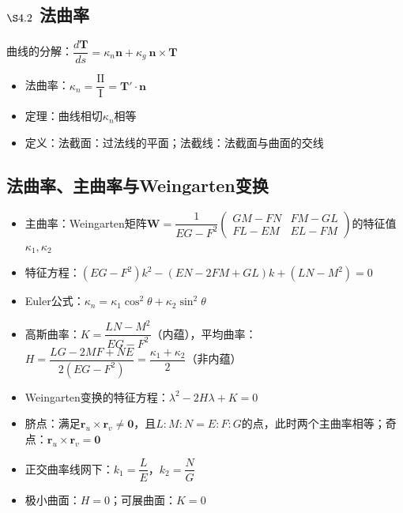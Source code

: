 \documentclass{article}
\begin{document}
	\subsection{$\S4.2$ 法曲率}
	曲线的分解：$\dfrac{d\boldsymbol{T}}{ds}=\kappa_n\boldsymbol{n}+\kappa_g\ \boldsymbol{n}\times\boldsymbol{T}$
	\begin{itemize}
		\item 法曲率：$\kappa_n=\dfrac{\mathrm{II}}{\mathrm{I}}=\boldsymbol{T}'\cdot\boldsymbol{n}$
		\item 定理：曲线相切$\kappa_n$相等
		\item 定义：法截面：过法线的平面；法截线：法截面与曲面的交线
	\end{itemize}
	
	\subsection{法曲率、主曲率与Weingarten变换}
	\begin{itemize}
		\item 主曲率：Weingarten矩阵$\boldsymbol{W}=\dfrac{1}{EG-F^2}\begin{pmatrix}GM-FN&FM-GL\\FL-EM&EL-FM\end{pmatrix}$的特征值$\kappa_1,\kappa_2$
		\item 特征方程：$(EG-F^2)k^2-(EN-2FM+GL)k+(LN-M^2)=0$
		\item Euler公式：$\kappa_n=\kappa_1\cos^2\theta+\kappa_2\sin^2\theta$
		\item 高斯曲率：$K=\dfrac{LN-M^2}{EG-F^2}$（内蕴），平均曲率：$H=\dfrac{LG-2MF+NE}{2(EG-F^2)}=\dfrac{\kappa_1+\kappa_2}{2}$（非内蕴）
		\item Weingarten变换的特征方程：$\lambda^2-2H\lambda+K=0$
		\item 脐点：满足$\boldsymbol{r}_u\times\boldsymbol{r}_v\neq\boldsymbol{0}$，且$L:M:N=E:F:G$的点，此时两个主曲率相等；奇点：$\boldsymbol{r}_u\times\boldsymbol{r}_v=\boldsymbol{0}$
		\item 正交曲率线网下：$k_1=\dfrac{L}{E}$，$k_2=\dfrac{N}{G}$
		\item 极小曲面：$H=0$；可展曲面：$K=0$
	\end{itemize}
	
\end{document}
